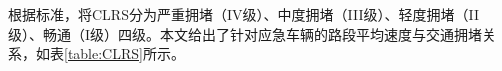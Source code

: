 

根据标准\cite{GA_T_115_2020}，将CLRS分为严重拥堵（IV级）、中度拥堵（III级）、轻度拥堵（II级）、畅通（I级）四级。本文给出了针对应急车辆的路段平均速度与交通拥堵关系，如表\ref{table:CLRS}所示。


